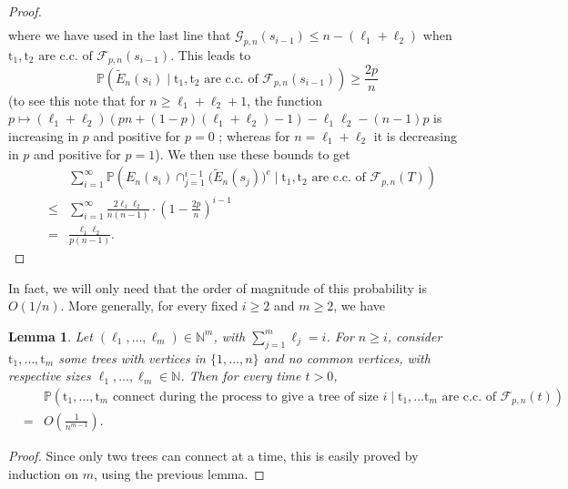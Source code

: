 \documentclass[a4, 11pt]{article}
\numberwithin{equation}{section}
\theoremstyle{plain}
\newtheorem{lemma}[theorem]{Lemma}
\theoremstyle{definition}
\theoremstyle{remark}
\begin{document}
\begin{proof}
\begin{eqnarray*}
\end{eqnarray*}
where we have used in the last line that $\mathcal G_{p,n}(s_{i-1})\leq n-(\ell_1+\ell_2)$ when $\mathrm t_1,\mathrm t_2 \text{ are c.c. of } \mathcal {F}_{p,n}(s_{i-1})$. This leads to
$$
 \mathbb P\left(\tilde E_{n}(s_i) \; | \;  \mathrm t_1,\mathrm t_2 \text{ are c.c. of } \mathcal {F}_{p,n}(s_{i-1})\right) \geq  \frac{2p}{n}
$$
(to see this note that for $n\geq \ell_1+\ell_2+1$, the function $p \mapsto (\ell_1+\ell_2)(pn+(1-p)(\ell_1+\ell_2)-1)-\ell_1\ell_2 -(n-1)p$ is increasing in $p$ and positive for $p=0$ ; whereas for $n=\ell_1+\ell_2$ it is decreasing in $p$ and positive for $p=1$). We then use these bounds to get 
\begin{eqnarray*}
 &&\sum_{i=1}^{\infty}  \mathbb P\left(E_{n}(s_i) \cap_{j=1}^{i-1} \big(\tilde E_{n}(s_j)\big)^c \; | \; \mathrm t_1,\mathrm t_2 \text{ are c.c. of } \mathcal {F}_{p,n}(T)\right) \\
 &\leq & \sum_{i=1}^{\infty}  \frac{2\ell_1\ell_2}{n(n-1)} \cdot \left(1- \frac{2p}{n}\right)^{i-1} \\
 &=& \frac{\ell_1\ell_2}{p(n-1)}.
\end{eqnarray*}
\end{proof}

In fact, we will only need that the order of magnitude of this probability is $O(1/n)$. More generally, for every fixed $i\geq 2 $ and $m \geq 2$, we have 

\begin{lemma}
\label{lem:treei}
Let $(\ell_1,\ldots,\ell_m)\in \mathbb N^m$, with $\sum_{j=1}^m \ell_j=i$. For $n\geq i$,
consider $\mathrm t_1,\ldots,\mathrm t_m$ some trees with vertices in $\{1,\ldots,n\}$ and no common vertices, with respective sizes $\ell_1,\ldots,\ell_m \in \mathbb N$. Then for every time $t>0$,
\begin{eqnarray*}
&& \mathbb P\left(\mathrm t_1,\ldots,\mathrm t_m \text{ connect during the process to give a tree of size }i \;  | \; \mathrm t_1,\ldots \mathrm t_m \text{ are c.c. of } \mathcal {F}_{p,n}(t)\right) \\
&=& O \left( \frac{1}{n^{m-1}}\right). \
\end{eqnarray*}
\end{lemma}

\begin{proof}
Since only two trees can connect at a time, this is easily proved by induction on $m$, using the previous lemma.
\end{proof}
\end{document}
